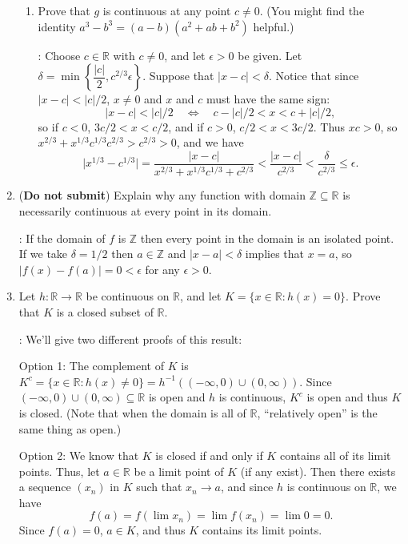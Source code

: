 \documentclass[letterpaper,12pt]{article}
\newcommand{\R}{\mathbb{R}}
\newcommand{\Z}{\mathbb{Z}}
\renewcommand{\ss}{\subseteq}
\newcommand{\abs}[1]{\lvert #1\rvert}
\begin{document}
\begin{enumerate}
\begin{enumerate}
 \item Prove that $g$ is continuous at any point $c\neq 0$. (You might find the identity $a^3-b^3=(a-b)(a^2+ab+b^2)$ helpful.)

\bigskip

: Choose $c\in \R$ with $c\neq 0$, and let $\epsilon>0$ be given. Let $\delta = \min\left\{\dfrac{\abs{c}}{2},c^{2/3}\epsilon\right\}$. Suppose that $\abs{x-c}<\delta$. Notice that since $\abs{x-c}<\abs{c}/2$, $x\neq 0$ and $x$ and $c$ must have the same sign:
\[
 \abs{x-c}<\abs{c}/2 \quad \Leftrightarrow \quad c-\abs{c}/2 < x < c+\abs{c}/2,
\]
so if $c<0$, $3c/2<x<c/2$, and if $c>0$, $c/2<x<3c/2$. Thus $xc>0$, so $x^{2/3}+x^{1/3}c^{1/3}c^{2/3}>c^{2/3}>0$, and we have
\[
 \abs{x^{1/3}-c^{1/3}} = \frac{\abs{x-c}}{x^{2/3}+x^{1/3}c^{1/3}+c^{2/3}}<\frac{\abs{x-c}}{c^{2/3}}<\frac{\delta}{c^{2/3}}\leq \epsilon.
\]


\bigskip

\end{enumerate}
 \item ({\bf Do not submit}) Explain why any function with domain $\Z\subseteq \R$ is necessarily continuous at every point in its domain.

\bigskip

: If the domain of $f$ is $\Z$ then every point in the domain is an isolated point. If we take $\delta=1/2$ then $a\in \Z$ and $\abs{x-a}<\delta$ implies that $x=a$, so $\abs{f(x)-f(a)}=0<\epsilon$ for any $\epsilon>0$.

\bigskip

 \item Let $h:\R\to\R$ be continuous on $\R$, and let $K=\{x\in \R : h(x)=0\}$. Prove that $K$ is a closed subset of $\R$.

\bigskip

: We'll give two different proofs of this result:

Option 1: The complement of $K$ is $K^c=\{x\in\R : h(x)\neq 0\} = h^{-1}((-\infty,0)\cup (0,\infty))$. Since $(-\infty,0)\cup (0,\infty)\ss\R$ is open and $h$ is continuous, $K^c$ is open and thus $K$ is closed. (Note that when the domain is all of $\R$, ``relatively open'' is the same thing as open.)

Option 2: We know that $K$ is closed if and only if $K$ contains all of its limit points. Thus, let $a\in\R$ be a limit point of $K$ (if any exist). Then there exists a sequence $(x_n)$ in $K$ such that $x_n\to a$, and since $h$ is continuous on $\R$, we have
\[
 f(a) = f(\lim x_n) = \lim f(x_n) = \lim 0 = 0.
\]
Since $f(a)=0$, $a\in K$, and thus $K$ contains its limit points.


\end{enumerate}
\end{document}
